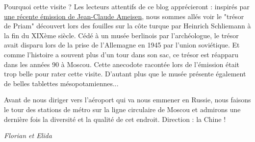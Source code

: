 Pourquoi cette visite ? Les lecteurs attentifs de ce blog apprécieront :
inspirés par
\href{https://www.franceinter.fr/emissions/sur-les-epaules-de-darwin/sur-les-epaules-de-darwin-10-mars-2018}{une
récente émission de Jean-Claude Ameisen}, nous sommes allés voir le
"trésor de Priam" découvert lors des fouilles sur la côte turque par
Heinrich Schliemann à la fin du XIXème siècle. Cédé à un musée berlinois
par l'archéologue, le trésor avait disparu lors de la prise de
l'Allemagne en 1945 par l'union soviétique. Et comme l'histoire a
souvent plus d'un tour dans son sac, ce trésor est réapparu dans les
années 90 à Moscou. Cette anecodote racontée lors de l'émission était
trop belle pour rater cette visite. D'autant plus que le musée présente
également de belles tablettes mésopotamiennes...

Avant de nous diriger vers l'aéroport qui va nous emmener en Russie,
nous faisons le tour des stations de métro sur la ligne circulaire de
Moscou et admirons une dernière fois la diversité et la qualité de cet
endroit. Direction : la Chine !

\emph{Florian et Elida}
